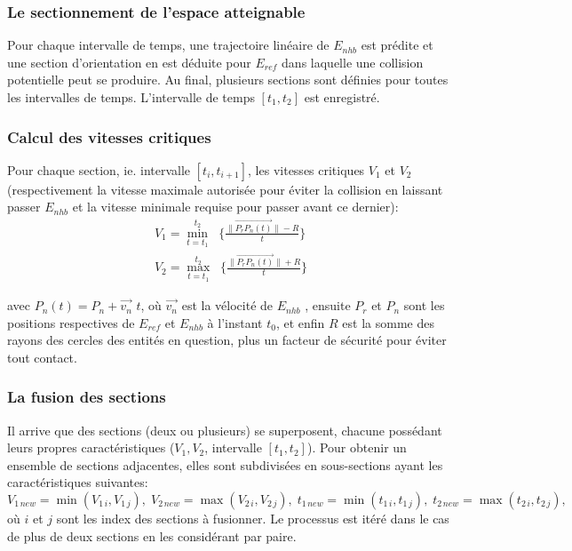 \documentclass[11pt]{article}
\begin{document}
\subsubsection*{Le sectionnement de l'espace atteignable}

Pour chaque intervalle de temps, une trajectoire linéaire de $E_{nhb}$ est prédite et une section d'orientation en est déduite pour $E_{ref}$ dans laquelle une collision potentielle peut se produire. Au final, plusieurs sections sont définies pour toutes les intervalles de temps. L'intervalle de temps $[t_1,t_2]$ est enregistré.

\subsubsection*{Calcul des vitesses critiques}

Pour chaque section, ie. intervalle $[t_i, t_{i+1}]$, les vitesses critiques $V_1$ et $V_2$ (respectivement la vitesse maximale autorisée pour éviter la collision en laissant passer $E_{nhb}$ et la vitesse minimale requise pour passer avant ce dernier):
\begin{eqnarray}
V_1 = \min_{t=t_1}^{t_2}\;\; \{\frac{\| \overrightarrow{P_rP_n(t)} \| - R}{t}\} \\
V_2 = \max_{t=t_1}^{t_2}\;\; \{\frac{\| \overrightarrow{P_rP_n(t)} \| + R}{t}\}
\end{eqnarray} 

avec $P_n(t) = P_n + \overrightarrow{v_n}\,\,t$, où $\overrightarrow{v_n}$ est la vélocité de $E_{nhb}$ , ensuite $P_r$ et $P_n$ sont les positions respectives de $E_{ref}$ et $E_{nhb}$ à l'instant $t_0$,  et enfin $R$ est la somme des rayons des cercles des entités en question, plus un facteur de sécurité pour éviter tout contact.

\subsubsection*{La fusion des sections}

Il arrive que des sections (deux ou plusieurs) se superposent, chacune possédant leurs propres caractéristiques ($V_1, V_2$, intervalle $[t_1,t_2]$). Pour obtenir un ensemble de sections adjacentes, elles sont subdivisées en sous-sections ayant les caractéristiques suivantes: $V_{1\,new} = \min (V_{1\,i}, V_{1\,j}), \;V_{2\,new} = \max (V_{2\,i}, V_{2\,j}), \; t_{1\,new} = \min (t_{1\,i}, t_{1\,j}), \;t_{2\,new} = \max (t_{2\,i}, t_{2\,j}), $ où $i$ et $j$ sont les index des sections à fusionner. Le processus est itéré dans le cas de plus de deux sections en les considérant par paire.
\end{document}
